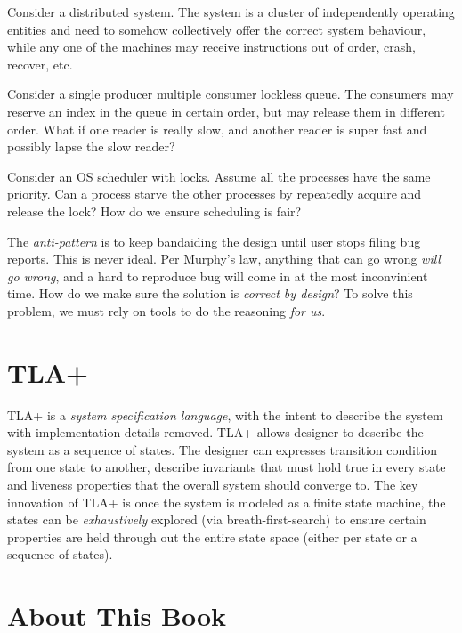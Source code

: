 Consider a distributed system. The system is a cluster of independently
operating entities and need to somehow collectively offer the correct system
behaviour, while any one of the machines may receive instructions out of order,
crash, recover, etc. \newline

Consider a single producer multiple consumer lockless queue. The consumers may 
reserve an index in the queue in certain order, but may release them in different order. 
What if one reader is really slow, and another reader is super fast and possibly 
lapse the slow reader? \newline

Consider an OS scheduler with locks. Assume all the processes have the same
priority. Can a process starve the other processes by repeatedly acquire and
release the lock? How do we ensure scheduling is fair?\newline

The \textit{anti-pattern} is to keep bandaiding the design until user stops
filing bug reports. This is never ideal. Per Murphy's law, anything that can go
wrong \textit{will go wrong}, and a hard to reproduce bug will come in at the
most inconvinient time. How do we make sure the solution is \textit{correct by
design}? To solve this problem, we must rely on tools to do the reasoning
\textit{for us}.

\section{TLA+}

TLA+ is a \textit{system specification language}, with the intent to describe
the system with implementation details removed. TLA+ allows designer to describe
the system as a sequence of states. The designer can expresses transition
condition from one state to another, describe invariants that must hold true in
every state and liveness properties that the overall system should converge to.
The key innovation of TLA+ is once the system is modeled as a finite state
machine, the states can be \textit{exhaustively} explored (via
breath-first-search) to ensure certain properties are held through out the
entire state space (either per state or a sequence of states).\newline

\section{About This Book}


